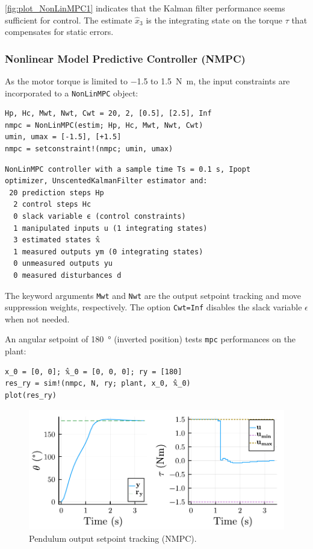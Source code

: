 \cref{fig:plot_NonLinMPC1} indicates that the Kalman filter performance seems sufficient for control. The estimate $\hat{x}_3$ is the integrating state on the torque $\tau$ that compensates for static errors. 

\subsubsection{Nonlinear Model Predictive Controller (NMPC)}

As the motor torque is limited to \num{-1.5} to \SI{1.5}{\newton\meter}, the input constraints are incorporated to a \texttt{NonLinMPC} object:
\begin{verbatim}
Hp, Hc, Mwt, Nwt, Cwt = 20, 2, [0.5], [2.5], Inf
nmpc = NonLinMPC(estim; Hp, Hc, Mwt, Nwt, Cwt)
umin, umax = [-1.5], [+1.5]
nmpc = setconstraint!(nmpc; umin, umax)
\end{verbatim}
\spacerepl
\begin{verbatim}
NonLinMPC controller with a sample time Ts = 0.1 s, Ipopt
optimizer, UnscentedKalmanFilter estimator and:
 20 prediction steps Hp
  2 control steps Hc
  0 slack variable ϵ (control constraints)
  1 manipulated inputs u (1 integrating states)
  3 estimated states 𝕩̂
  1 measured outputs ym (0 integrating states)
  0 unmeasured outputs yu
  0 measured disturbances d
\end{verbatim}
The keyword arguments \texttt{Mwt} and \texttt{Nwt} are the output setpoint tracking and move suppression weights, respectively. The option \texttt{Cwt=Inf} disables the slack variable $\epsilon$ when not needed. 

An angular setpoint of \SI{180}{\degree} (inverted position) tests \texttt{mpc} performances on the plant:
\begin{verbatim}
x_0 = [0, 0]; 𝕩̂_0 = [0, 0, 0]; ry = [180]
res_ry = sim!(nmpc, N, ry; plant, x_0, 𝕩̂_0)
plot(res_ry)
\end{verbatim}

\begin{figure}[ht]
    \centering
    \includegraphics[width=\columnwidth]{fig/plot_NonLinMPC2.pdf}
    \caption{Pendulum output setpoint tracking (NMPC).}\label{fig:plot_NonLinMPC2}
\end{figure}

